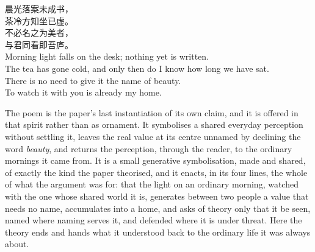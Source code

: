 \goldrule

\begin{center}
\begin{minipage}{0.82\linewidth}
\centering\itshape\color{rose}

{\cjk 晨光落案未成书，}\\[0.2em]
{\cjk 茶冷方知坐已虚。}\\[0.2em]
{\cjk 不必名之为美者，}\\[0.2em]
{\cjk 与君同看即吾庐。}\\[1.4em]

\upshape\normalcolor
Morning light falls on the desk; nothing yet is written.\\[0.15em]
The tea has gone cold, and only then do I know how long we have sat.\\[0.15em]
There is no need to give it the name of beauty.\\[0.15em]
To watch it with you is already my home.

\end{minipage}
\end{center}

\vspace{1em}

\noindent
The poem is the paper's last instantiation of its own claim, and it is offered in that spirit rather than as ornament. It symbolises a shared everyday perception without settling it, leaves the real value at its centre unnamed by declining the word \emph{beauty}, and returns the perception, through the reader, to the ordinary mornings it came from. It is a small generative symbolisation, made and shared, of exactly the kind the paper theorised, and it enacts, in its four lines, the whole of what the argument was for: that the light on an ordinary morning, watched with the one whose shared world it is, generates between two people a value that needs no name, accumulates into a home, and asks of theory only that it be seen, named where naming serves it, and defended where it is under threat. Here the theory ends and hands what it understood back to the ordinary life it was always about.
